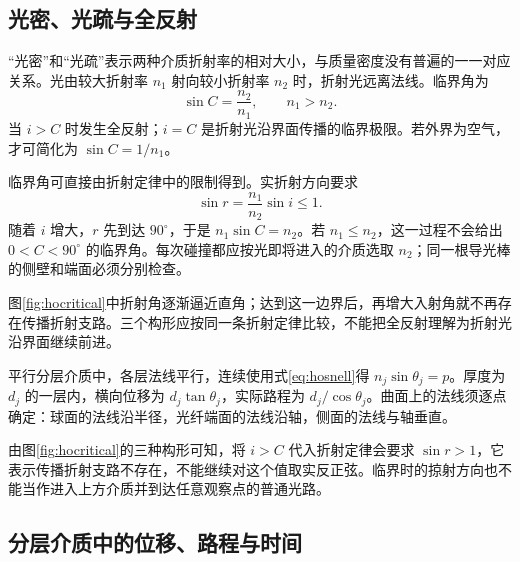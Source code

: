 \subsection{光密、光疏与全反射}

“光密”和“光疏”表示两种介质折射率的相对大小，与质量密度没有普遍的一一对应关系。光由较大折射率 $n_1$ 射向较小折射率 $n_2$ 时，折射光远离法线。临界角为
\begin{equation}\label{eq:hocritical}
\sin C=\frac{n_2}{n_1},\qquad n_1>n_2.
\end{equation}
当 $i>C$ 时发生全反射；$i=C$ 是折射光沿界面传播的临界极限。若外界为空气，才可简化为 $\sin C=1/n_1$。

临界角可直接由折射定律中的限制得到。实折射方向要求
\[
\sin r=\frac{n_1}{n_2}\sin i\le1.
\]
随着 $i$ 增大，$r$ 先到达 $90^\circ$，于是 $n_1\sin C=n_2$。若 $n_1\le n_2$，这一过程不会给出 $0<C<90^\circ$ 的临界角。每次碰撞都应按光即将进入的介质选取 $n_2$；同一根导光棒的侧壁和端面必须分别检查。

图\ref{fig:hocritical}中折射角逐渐逼近直角；达到这一边界后，再增大入射角就不再存在传播折射支路。三个构形应按同一条折射定律比较，不能把全反射理解为折射光沿界面继续前进。


平行分层介质中，各层法线平行，连续使用式\eqref{eq:hosnell}得 $n_j\sin\theta_j=p$。厚度为 $d_j$ 的一层内，横向位移为 $d_j\tan\theta_j$，实际路程为 $d_j/\cos\theta_j$。曲面上的法线须逐点确定：球面的法线沿半径，光纤端面的法线沿轴，侧面的法线与轴垂直。

由图\ref{fig:hocritical}的三种构形可知，将 $i>C$ 代入折射定律会要求 $\sin r>1$，它表示传播折射支路不存在，不能继续对这个值取实反正弦。临界时的掠射方向也不能当作进入上方介质并到达任意观察点的普通光路。

\subsection{分层介质中的位移、路程与时间}

